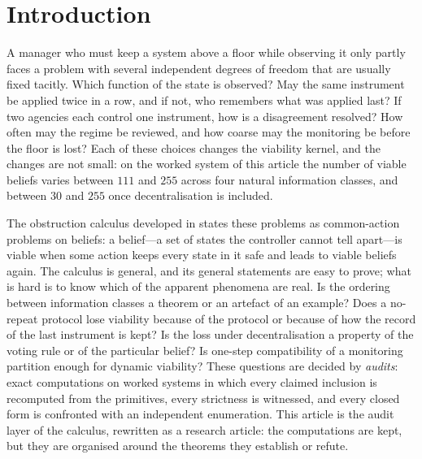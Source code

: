 \section{Introduction}\label{sec:intro}

A manager who must keep a system above a floor while observing it only partly faces a problem with several independent degrees of freedom that are usually fixed tacitly. Which function of the state is observed? May the same instrument be applied twice in a row, and if not, who remembers what was applied last? If two agencies each control one instrument, how is a disagreement resolved? How often may the regime be reviewed, and how coarse may the monitoring be before the floor is lost? Each of these choices changes the viability kernel, and the changes are not small: on the worked system of this article the number of viable beliefs varies between $111$ and $255$ across four natural information classes, and between $30$ and $255$ once decentralisation is included.

The obstruction calculus developed in \cite{Abaee2026calc} states these problems as common-action problems on beliefs: a belief---a set of states the controller cannot tell apart---is viable when some action keeps every state in it safe and leads to viable beliefs again. The calculus is general, and its general statements are easy to prove; what is hard is to know which of the apparent phenomena are real. Is the ordering between information classes a theorem or an artefact of an example? Does a no-repeat protocol lose viability because of the protocol or because of how the record of the last instrument is kept? Is the loss under decentralisation a property of the voting rule or of the particular belief? Is one-step compatibility of a monitoring partition enough for dynamic viability? These questions are decided by \emph{audits}: exact computations on worked systems in which every claimed inclusion is recomputed from the primitives, every strictness is witnessed, and every closed form is confronted with an independent enumeration. This article is the audit layer of the calculus, rewritten as a research article: the computations are kept, but they are organised around the theorems they establish or refute.

